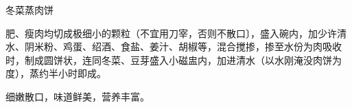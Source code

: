 \begin{recipe}{冬菜蒸肉饼}

\ingredients


\cooking

肥、瘦肉均切成极细小的颗粒（不宜用刀宰，否则不散口〕，盛入碗内，加少许清水、阴米粉、鸡蛋、绍酒、食盐、姜汁、胡椒等，混合搅掺，掺至水份为肉吸收时，制成圆饼状，连同冬菜、豆芽盛入小磁盅内，加进清水（以水刚淹没肉饼为度），蒸约半小时即成。

\notes

细嫩散口，味道鲜美，营养丰富。

\end{recipe}

